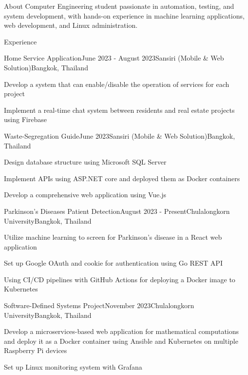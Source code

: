 \documentclass[12pt]{resume}
\begin{document}
\begin{rSection}{About}
    Computer Engineering student passionate in automation, testing, and system development, with hands-on experience in machine learning applications, web development, and Linux administration.
\end{rSection}

\begin{rSection}{Experience}

    \begin{rSubsection}{Home Service Application}{June 2023 - August 2023}{Sansiri (Mobile \& Web Solution)}{Bangkok, Thailand}
        \item Develop a system that can enable/disable the operation of services for each project
        \item Implement a real-time chat system between residents and real estate projects using Firebase
    \end{rSubsection}

	\begin{rSubsection}{Waste-Segregation Guide}{June 2023}{Sansiri (Mobile \& Web Solution)}{Bangkok, Thailand}
        \item Design database structure using Microsoft SQL Server
        \item Implement APIs using ASP.NET core and deployed them as Docker containers
        \item Develop a comprehensive web application using Vue.js
	\end{rSubsection}

	\begin{rSubsection}{Parkinson's Diseases Patient Detection}{August 2023 - Present}{Chulalongkorn University}{Bangkok, Thailand}
        \item Utilize machine learning to screen for Parkinson's disease in a React web application
        \item Set up Google OAuth and cookie for authentication using Go REST API
        \item Using CI/CD pipelines with GitHub Actions for deploying a Docker image to Kubernetes
	\end{rSubsection}

	\begin{rSubsection}{Software-Defined Systems Project}{November 2023}{Chulalongkorn University}{Bangkok, Thailand}
        \item Develop a microservices-based web application for mathematical computations and deploy it as a Docker container using Ansible and Kubernetes on multiple Raspberry Pi devices
        \item Set up Linux monitoring system with Grafana
	\end{rSubsection}

\end{rSection}
\end{document}
